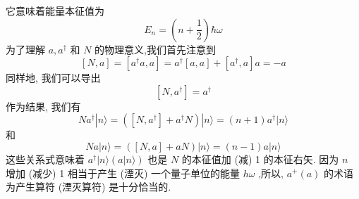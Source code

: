 \documentclass[lang=cn,newtx,10pt,scheme=chinese,thmcnt=section]{elegantbook}
\begin{document}
它意味着能量本征值为
\begin{equation}
	{E}_{n} = \left( {n + \frac{1}{2}}\right) \hbar \omega
\end{equation}
为了理解 $a,{a}^{ \dagger }$ 和 $N$ 的物理意义,我们首先注意到
\begin{equation}
	\left\lbrack {N, a}\right\rbrack = \left\lbrack {{a}^{ \dagger }a, a}\right\rbrack = {a}^{ \dagger }\left\lbrack {a, a}\right\rbrack + \left\lbrack {{a}^{ \dagger }, a}\right\rbrack a = - a
\end{equation}
同样地, 我们可以导出
\begin{equation}
	\left\lbrack {N,{a}^{ \dagger }}\right\rbrack = {a}^{ \dagger }
\end{equation}
作为结果, 我们有
\begin{equation}
	N{a}^{ \dagger }| {n\rangle = \left( {\left\lbrack {N,{a}^{ \dagger }}\right\rbrack + {a}^{ \dagger }N}\right) }| n\rangle = \left( {n + 1}\right) {a}^{ \dagger }|n\rangle
\end{equation}
和
\begin{equation}
	{Na}\left| {n\rangle = \left( {\left\lbrack {N, a}\right\rbrack + {aN}}\right) }\right| n\rangle = \left( {n - 1}\right) a|n\rangle
\end{equation}
这些关系式意味着 ${a}^\dagger\left| {n\rangle \left( a | n\rangle\right) }$ 也是 $N$ 的本征值加 (减) 1 的本征右矢. 因为 $n$ 增加 (减少) 1 相当于产生 (湮灭) 一个量子单位的能量 ${h\omega }$ ,所以, ${a}^{ + }\left( a\right)$ 的术语为产生算符 (湮灭算符) 是十分恰当的.
\end{document}

